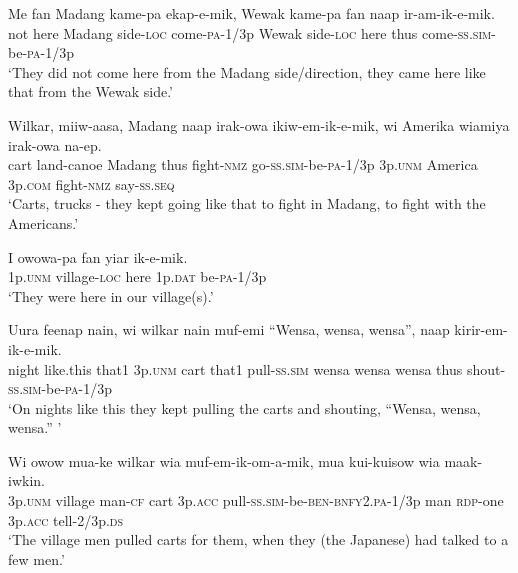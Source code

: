{\ea\label{ex:a:x33}
\gll  Me  fan  Madang  kame-pa  ekap-e-mik, Wewak  kame-pa  fan  naap  ir-am-ik-e-mik. \\
not  here  Madang  side-\textsc{loc}  come-\textsc{pa}-1/3p Wewak  side-\textsc{loc}  here  thus  come-\textsc{ss}.\textsc{sim}-be-\textsc{pa}-1/3p\\ 
\glt ‘They did not come here from the Madang side/direction, they came here like that from the Wewak side.’ \\
\z


\ea\label{ex:a:x34}
\gll  Wilkar,  miiw-aasa,  Madang  naap{  irak-owa  ikiw-em-ik-e-mik,} {wi  Amerika  wiamiya  irak-owa  na-ep.} \\
cart  land-canoe  Madang  thus  fight-\textsc{nmz}  go-\textsc{ss}.\textsc{sim}-be-\textsc{pa}-1/3p 3p.\textsc{unm}  America  3p.\textsc{com}  fight-\textsc{nmz}  say{}-\textsc{ss.seq}\\ 
\glt ‘Carts, trucks - they kept going like that to fight in Madang, to fight with the Americans.’ \\
\z


\ea\label{ex:a:x35}
\gll  I  owowa-pa  fan  yiar  ik-e-mik. \\
1p.\textsc{unm}  village-\textsc{loc}  here  1p.\textsc{dat}  be-\textsc{pa}-1/3p \\
\glt ‘They were here in our village(s).’ \\
\z


\ea\label{ex:a:x36}
\gll  Uura  feenap  nain,  wi  wilkar  nain  muf-emi “Wensa,  wensa,  wensa”,  naap  kirir-em-ik-e-mik.\\
night  like.this  that1  3p.\textsc{unm}  cart  that1  pull-\textsc{ss}.\textsc{sim} wensa  wensa  wensa  thus  shout-\textsc{ss}.\textsc{sim}-be-\textsc{pa}-1/3p \\ 
\glt ‘On nights like this they kept pulling the carts and shouting, “Wensa, wensa, wensa.” ’ \\
\z


\ea\label{ex:a:x37}
\gll  Wi  owow  mua-ke  wilkar  wia muf-em-ik-om-a-mik,  mua  kui-kuisow wia  maak-iwkin.\\
3p.\textsc{unm}  village  man-\textsc{cf}  cart  3p.\textsc{acc} pull-\textsc{ss}.\textsc{sim}-be-\textsc{ben}-\textsc{bnfy}2.\textsc{pa}-1/3p  man  \textsc{rdp}-one 3p.\textsc{acc}  tell-2/3p.\textsc{ds}\\ 
\glt ‘The village men pulled carts for them, when they (the Japanese) had talked to a few men.’ \\
\z


}
